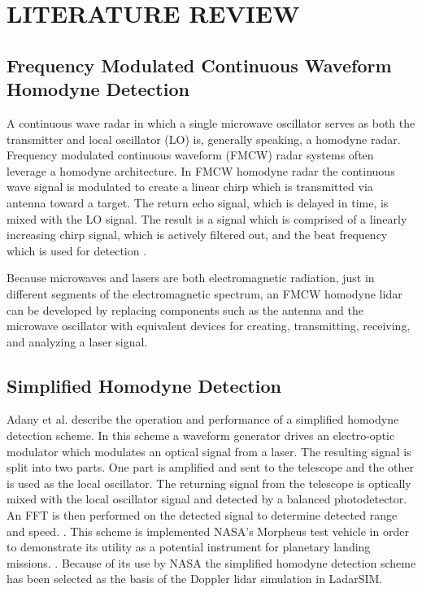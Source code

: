 %
%
%
%

\chapter{LITERATURE REVIEW}

\section{Frequency Modulated Continuous Waveform Homodyne Detection}
A continuous wave radar in which a single microwave oscillator serves as both
the transmitter and local oscillator (LO) is, generally speaking, a homodyne radar.
Frequency modulated continuous waveform (FMCW) radar systems often leverage a 
homodyne architecture. In FMCW homodyne radar the continuous wave signal is modulated
to create a linear chirp which is transmitted via antenna toward a target. The return
echo signal, which is delayed in time, is mixed with the LO signal. The result is a signal 
which is comprised of a linearly increasing chirp signal, which is actively filtered out, and 
the beat frequency which is used for detection \cite{brooker2009}. 

Because microwaves and lasers are both electromagnetic radiation, just in different
segments of the electromagnetic spectrum, an FMCW homodyne lidar can be developed by 
replacing components such as the antenna and the microwave oscillator with equivalent 
devices for creating, transmitting, receiving, and analyzing a laser signal. 


\section{Simplified Homodyne Detection}
Adany et al.
describe the operation and performance of a simplified homodyne detection
scheme.
In this scheme a waveform generator drives an electro-optic modulator which
modulates an optical signal from a laser.
The resulting signal is split into two parts.
One part is amplified and sent to the telescope and the other is used as
the local oscillator.
The returning signal from the telescope is optically mixed with the local
oscillator signal and detected by a balanced photodetector.
An FFT is then performed on the detected signal to determine detected range
and speed.
\cite{adany09}.
This scheme is implemented NASA's Morpheus test vehicle in order to demonstrate
its utility as a potential instrument for planetary landing missions.
\cite{amz12,amz12p2,amz12fiber,amz16coherent}.
Because of its use by NASA the simplified homodyne detection scheme has
been selected as the basis of the Doppler lidar simulation in LadarSIM.

